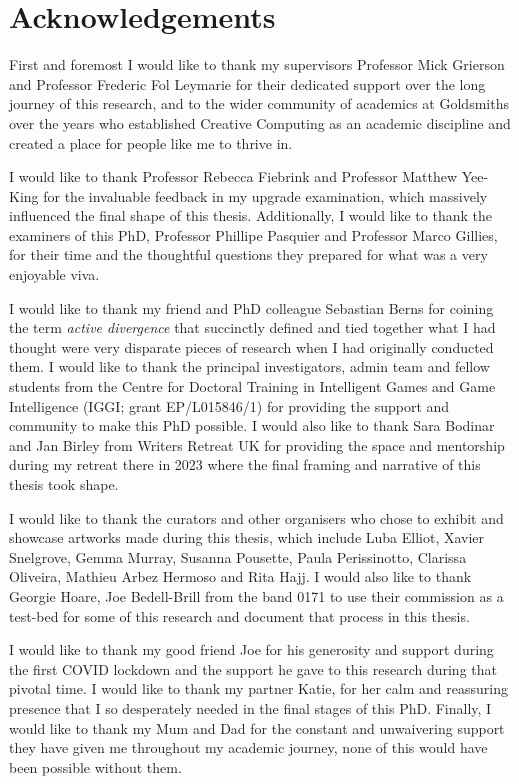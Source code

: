 \chapter*{Acknowledgements}

First and foremost I would like to thank my supervisors Professor Mick Grierson and Professor Frederic Fol Leymarie for their dedicated support over the long journey of this research, and to the wider community of academics at Goldsmiths over the years who established Creative Computing as an academic discipline and created a place for people like me to thrive in. 

I would like to thank Professor Rebecca Fiebrink and Professor Matthew Yee-King for the invaluable feedback in my upgrade examination, which massively influenced the final shape of this thesis. Additionally, I would like to thank the examiners of this PhD, Professor Phillipe Pasquier and Professor Marco Gillies, for their time and the thoughtful questions they prepared for what was a very enjoyable viva. 

I would like to thank my friend and PhD colleague Sebastian Berns for coining the term \textit{active divergence} that succinctly defined and tied together what I had thought were very disparate pieces of research when I had originally conducted them. I would like to thank the principal investigators, admin team and fellow students from the Centre for Doctoral Training in Intelligent Games and Game Intelligence (IGGI; grant EP/L015846/1) for providing the support and community to make this PhD possible. I would also like to thank Sara Bodinar and Jan Birley from Writers Retreat UK for providing the space and mentorship during my retreat there in 2023 where the final framing and narrative of this thesis took shape. 

I would like to thank the curators and other organisers who chose to exhibit and showcase artworks made during this thesis, which include Luba Elliot, Xavier Snelgrove, Gemma Murray, Susanna Pousette, Paula Perissinotto, Clarissa Oliveira, Mathieu Arbez Hermoso and Rita Hajj. I would also like to thank Georgie Hoare, Joe Bedell-Brill from the band 0171 to use their commission as a test-bed for some of this research and document that process in this thesis.

I would like to thank my good friend Joe for his generosity and support during the first COVID lockdown and the support he gave to this research during that pivotal time. I would like to thank my partner Katie, for her calm and reassuring presence that I so desperately needed in the final stages of this PhD. Finally, I would like to thank my Mum and Dad for the constant and unwaivering support they have given me throughout my academic journey, none of this would have been possible without them. 

